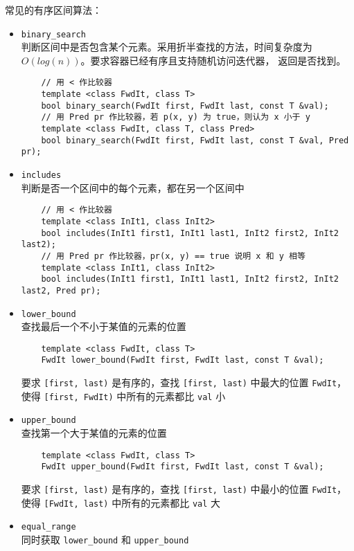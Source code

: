\documentclass[UTF8]{ctexart}
\begin{document}
常见的有序区间算法：
\begin{itemize}
    \item \texttt{binary\_search} \\
    判断区间中是否包含某个元素。采用折半查找的方法，时间复杂度为 $O(log(n))$。要求容器已经有序且支持随机访问迭代器，
    返回是否找到。
    \begin{verbatim}
    // 用 < 作比较器
    template <class FwdIt, class T>
    bool binary_search(FwdIt first, FwdIt last, const T &val);
    // 用 Pred pr 作比较器，若 p(x, y) 为 true，则认为 x 小于 y
    template <class FwdIt, class T, class Pred>
    bool binary_search(FwdIt first, FwdIt last, const T &val, Pred pr);
    \end{verbatim}
    \item \texttt{includes} \\
    判断是否一个区间中的每个元素，都在另一个区间中
    \begin{verbatim}
    // 用 < 作比较器
    template <class InIt1, class InIt2>
    bool includes(InIt1 first1, InIt1 last1, InIt2 first2, InIt2 last2);
    // 用 Pred pr 作比较器，pr(x, y) == true 说明 x 和 y 相等
    template <class InIt1, class InIt2>
    bool includes(InIt1 first1, InIt1 last1, InIt2 first2, InIt2 last2, Pred pr);
    \end{verbatim}
    \item \texttt{lower\_bound} \\
    查找最后一个不小于某值的元素的位置
    \begin{verbatim}
    template <class FwdIt, class T>
    FwdIt lower_bound(FwdIt first, FwdIt last, const T &val);
    \end{verbatim}
    要求 \texttt{[first, last)} 是有序的，查找 \texttt{[first, last)} 中最大的位置 \texttt{FwdIt}，使得
    \texttt{[first, FwdIt)} 中所有的元素都比 \texttt{val} 小
    \item \texttt{upper\_bound} \\
    查找第一个大于某值的元素的位置
    \begin{verbatim}
    template <class FwdIt, class T>
    FwdIt upper_bound(FwdIt first, FwdIt last, const T &val);
    \end{verbatim}
    要求 \texttt{[first, last)} 是有序的，查找 \texttt{[first, last)} 中最小的位置 \texttt{FwdIt}，使得
    \texttt{[FwdIt, last)} 中所有的元素都比 \texttt{val} 大
    \item \texttt{equal\_range} \\
    同时获取 \texttt{lower\_bound} 和 \texttt{upper\_bound}

\end{itemize}
\end{document}

